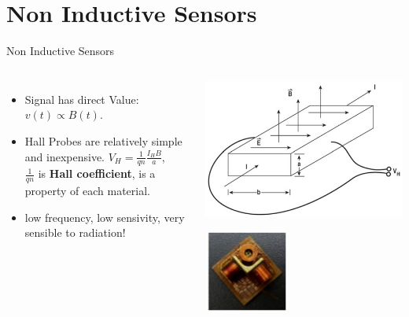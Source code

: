 \documentclass{beamer}
\begin{document}
\section{Non Inductive Sensors}
\begin{frame}{Non Inductive Sensors}{}
	\begin{columns}
		\begin{itemize}
			\item Signal has direct Value: $v(t) \propto B(t)$.
			\item Hall Probes are relatively simple and inexpensive. $V_H=\frac{1}{q n} \frac{I_H B}{a}$, \\
			$\frac{1}{q n} $ is \textbf{Hall coefficient}, is a property of each material.
			\item {\color{red} low frequency, low sensivity,  very sensible to radiation!}
		\end{itemize}
			\begin{center}
				\includegraphics[width=0.8 \columnwidth]{Hall.png}

				\includegraphics[width=0.4 \columnwidth]{Hall.jpg}
			\end{center}
 	 \end{columns}  	
\end{frame}
\end{document}
